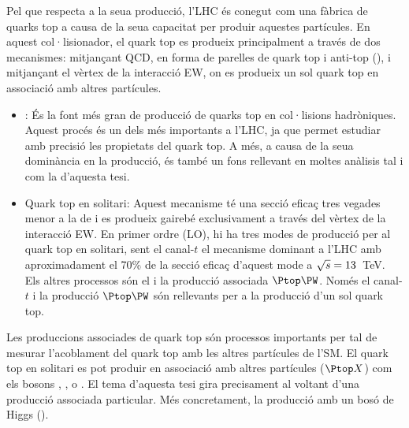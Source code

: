 Pel que respecta a la seua producció, l'LHC és conegut com una fàbrica de quarks 
top a causa de la seua capacitat per produir aquestes partícules. En aquest col·lisionador,
el quark top es produeix principalment a través de dos mecanismes: mitjançant QCD, en 
forma de parelles de quark top i anti-top (\ttbar), i mitjançant el vèrtex \Wtb de la interacció EW, on
es produeix un sol quark top en associació amb altres partícules. 
\begin{itemize}
	\item \ttbar: És la font més gran de producció de quarks top en col·lisions hadròniques.
		Aquest procés és un dels més importants a l'LHC, ja que permet estudiar amb precisió 
		les propietats del quark top. A més, a causa de la seua dominància en la producció, \ttbar 
		és també un fons rellevant en moltes anàlisis tal i com la d'aquesta tesi.
	\item Quark top en solitari: Aquest mecanisme té una secció eficaç tres vegades menor a 
		la de \ttbar i es produeix gairebé exclusivament a través del vèrtex \Wtb de la interacció EW. %
		En primer ordre (LO), hi ha tres modes de producció per al quark top en solitari, sent el canal-$t$ 
		el mecanisme dominant a l'LHC amb aproximadament el 70\% de la secció eficaç d'aquest mode  
		a $\sqrt{s}=13$~TeV. Els altres processos són el \schannel i la producció associada $\Ptop\PW$. 
		Només el canal-$t$  i la producció $\Ptop\PW$ són rellevants per a la producció d'un sol quark top.
\end{itemize}
Les produccions associades de quark top són processos importants per tal de mesurar l'acoblament 
del quark top amb les altres partícules de l'SM. El quark top en solitari es pot produir en associació 
amb altres partícules ($\Ptop X$) com els bosons \PZ, \PW, \Pgamma o \PHiggs. 
El tema d'aquesta tesi gira precisament al voltant d'una producció 
associada particular. Més concretament, la producció amb un bosó de Higgs (\tHq).

